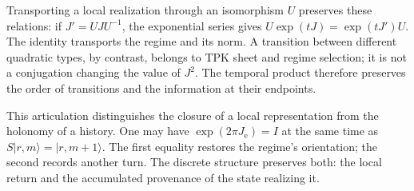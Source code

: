 Transporting a local realization through an isomorphism \(U\) preserves
these relations: if \(J'=UJU^{-1}\), the exponential series gives
\(U\exp(tJ)=\exp(tJ')U\). The identity transports the regime and its
norm. A transition between different quadratic types, by contrast, belongs
to TPK sheet and regime selection; it is not a conjugation
changing the value of \(J^2\). The temporal product therefore preserves the
order of transitions and the information at their endpoints.

This articulation distinguishes the closure of a local representation from the
holonomy of a history. One may have \(\exp(2\pi J_{\mathrm e})=I\)
at the same time as \(S|r,m\rangle=|r,m+1\rangle\). The first equality
restores the regime's orientation; the second records another turn. The
discrete structure preserves both: the local return and the accumulated
provenance of the state realizing it.
